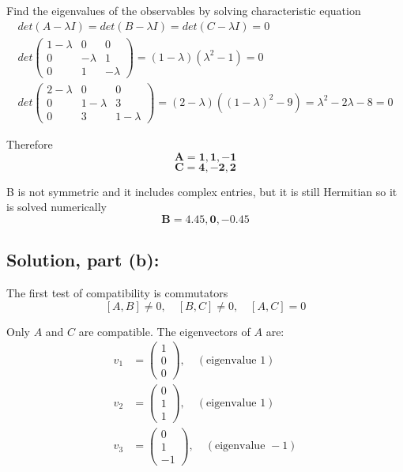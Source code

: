 \documentclass[12pt]{article}
\begin{document}
        Find the eigenvalues of the observables by solving characteristic equation
        \begin{align*}
            det(A-\lambda I) = det(B-\lambda I) = det(C-\lambda I) = 0 \\
            det\begin{pmatrix}
            1-\lambda & 0 & 0 \\
            0 & -\lambda & 1 \\
            0 & 1 & -\lambda
            \end{pmatrix} = (1-\lambda)(\lambda^2 - 1) = 0 \\
            det\begin{pmatrix}
            2-\lambda & 0 & 0 \\
            0 & 1-\lambda & 3 \\
            0 & 3 & 1-\lambda
            \end{pmatrix} = (2-\lambda)((1-\lambda)^2-9) = \lambda^2 - 2\lambda - 8 = 0
        \end{align*}  

        Therefore 
        \[
            \boldsymbol{\boxed{A = 1,1,-1}}
        \]
        \[
            \boldsymbol{\boxed{C = 4, -2, 2}}
        \]

        B is not symmetric and it includes complex entries, but it is still Hermitian so it is solved numerically
        \[
            \boldsymbol{\boxed{B = 4.45, 0, -0.45}}
        \]

    \subsection{Solution, part (b):}
        The first test of compatibility is commutators
        \[
            [A, B] \neq 0, \quad [B, C] \neq 0, \quad [A, C] = 0
        \]

        Only \( A \) and \( C \) are compatible.
        The eigenvectors of \( A \) are:
        \[
            \begin{aligned}
            v_1 &= \begin{pmatrix}1 \\ 0 \\ 0\end{pmatrix}, \quad (\text{eigenvalue } 1) \\
            v_2 &= \begin{pmatrix}0 \\ 1 \\ 1\end{pmatrix}, \quad (\text{eigenvalue } 1) \\
            v_3 &= \begin{pmatrix}0 \\ 1 \\ -1\end{pmatrix}, \quad (\text{eigenvalue } -1)
            \end{aligned}
        \]
\end{document}
